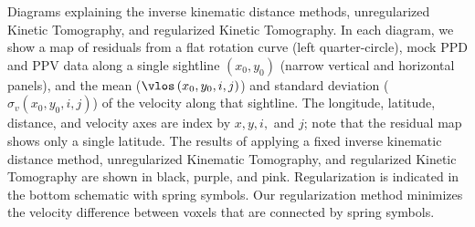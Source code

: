 \label{fig:diagram} Diagrams explaining the inverse kinematic distance methods, unregularized Kinetic Tomography, and regularized Kinetic Tomography. In each diagram, we show a map of residuals from a flat rotation curve (left quarter-circle), mock PPD and PPV data along a single sightline $\left(x_0, y_0\right)$ (narrow vertical and horizontal panels), and the mean ($\vlos\left(x_0, y_0, i, j\right)$) and standard deviation ($\sigma_v\left(x_0, y_0, i, j\right)$) of the velocity along that sightline. The longitude, latitude, distance, and velocity axes are index by $x, y, i,$ and $j$; note that the residual map shows only a single latitude. The results of applying a fixed inverse kinematic distance method, unregularized Kinematic Tomography, and regularized Kinetic Tomography are shown in black, purple, and pink. Regularization is indicated in the bottom schematic with spring symbols. Our regularization method minimizes the velocity difference between voxels that are connected by spring symbols. 
